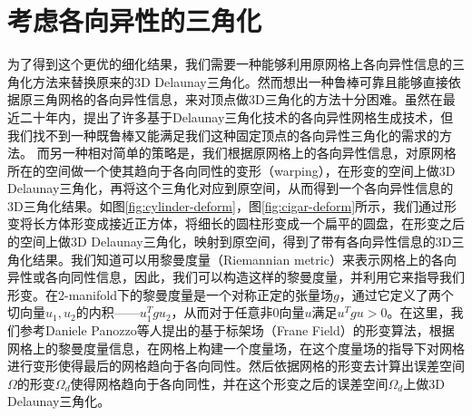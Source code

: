 \section{考虑各向异性的三角化}
为了得到这个更优的细化结果，我们需要一种能够利用原网格上各向异性信息的三角化方法来替换原来的3D Delaunay三角化。然而想出一种鲁棒可靠且能够直接依据原三角网格的各向异性信息，来对顶点做3D三角化的方法十分困难。虽然在最近二十年内，提出了许多基于Delaunay三角化技术的各向异性网格生成技术，但我们找不到一种既鲁棒又能满足我们这种固定顶点的各向异性三角化的需求的方法。
而另一种相对简单的策略是，我们根据原网格上的各向异性信息，对原网格所在的空间做一个使其趋向于各向同性的变形（warping），在形变的空间上做3D Delaunay三角化，再将这个三角化对应到原空间，从而得到一个各向异性信息的3D三角化结果。如图\ref{fig:cylinder-deform}，图\ref{fig:cigar-deform}所示，我们通过形变将长方体形变成接近正方体，将细长的圆柱形变成一个扁平的圆盘，在形变之后的空间上做3D Delaunay三角化，映射到原空间，得到了带有各向异性信息的3D三角化结果。我们知道可以用黎曼度量（Riemannian metric）来表示网格上的各向异性或各向同性信息，因此，我们可以构造这样的黎曼度量，并利用它来指导我们形变。在2-manifold下的黎曼度量是一个对称正定的张量场$g$，通过它定义了两个切向量$u_1, u_2$的内积——$u_1^T g u_2$，从而对于任意非0向量$u$满足$u^T g u>0$。在这里，我们参考Daniele Panozzo等人提出的基于标架场（Frane Field）的形变算法\cite{frame-field-warping}，根据网格上的黎曼度量信息，在网格上构建一个度量场，在这个度量场的指导下对网格进行变形使得最后的网格趋向于各向同性。然后依据网格的形变去计算出误差空间$\Omega$的形变$\Omega_d$使得网格趋向于各向同性，并在这个形变之后的误差空间$\Omega_d$上做3D Delaunay三角化。

